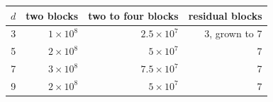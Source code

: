 \begin{tabular}{@{}crrr@{}}
\toprule
$d$ & two blocks & two to four blocks & residual blocks \\
\midrule
3 & $1\times10^8$ & $2.5\times10^7$ & 3, grown to 7 \\
5 & $2\times10^8$ & $5\times10^7$ & 7 \\
7 & $3\times10^8$ & $7.5\times10^7$ & 7 \\
9 & $2\times10^8$ & $5\times10^7$ & 7 \\
\bottomrule
\end{tabular}
